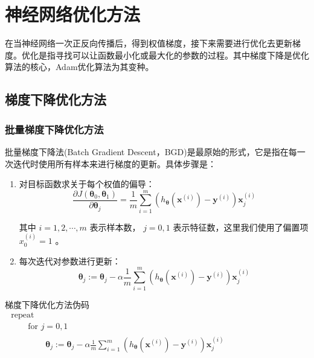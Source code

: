\documentclass[UTF-8]{progbookcn}
\begin{document}
\chapter{神经网络优化方法}
在当神经网络一次正反向传播后，得到权值梯度，接下来需要进行优化去更新梯度。优化是指寻找可以让函数最小化或最大化的参数的过程。其中梯度下降是优化算法的核心，Adam优化算法为其变种。


\section{梯度下降优化方法}
\subsection{批量梯度下降优化方法}
批量梯度下降法(Batch Gradient Descent，BGD)是最原始的形式，它是指在每一次迭代时使用所有样本来进行梯度的更新\cite{DBLP:journals/connection/Neelakanta96}。具体步骤是：
\begin{enumerate}
  \item 对目标函数求关于每个权值的偏导：$$\frac{\partial J\left(\bm{\theta}_{0}, \bm{\theta}_{1}\right)}{\partial \bm{\theta}_{j}}=\frac{1}{m} \sum_{i=1}^{m}\left(h_{\bm{\theta}}\left(\bm{x}^{(i)}\right)-\bm{y}^{(i)}\right) \bm{x}_{j}^{(i)}$$

其中 $i=1,2,\cdots,m$ 表示样本数， $j=0,1$ 表示特征数，这里我们使用了偏置项 $x_0^{(i)}=1$ 。
  \item 每次迭代对参数进行更新： $$\bm{\theta}_{j}:=\bm{\theta}_{j}-\alpha \frac{1}{m} \sum_{i=1}^{m}\left(h_{\bm{\theta}}\left(\bm{x}^{(i)}\right)-\bm{y}^{(i)}\right) \bm{x}_{j}^{(i)}$$
\end{enumerate}

\begin{titledbox}{梯度下降优化方法伪码\cite{DBLP:journals/nn/WilsonM03}}
$\begin{array}{l}{\text { repeat }} \\  { \qquad\text { for }j=0,1} \\{\qquad \qquad \begin{array}{l}{\bm{\theta}_{j}:=\bm{\theta}_{j}-\alpha \frac{1}{m} \sum_{i=1}^{m}\left(h_{\bm{\theta}}\left(\bm{x}^{(i)}\right)-\bm{y}^{(i)}\right) \bm{x}_{j}^{(i)}} \end{array}}\end{array}$
\end{titledbox}
\end{document}
